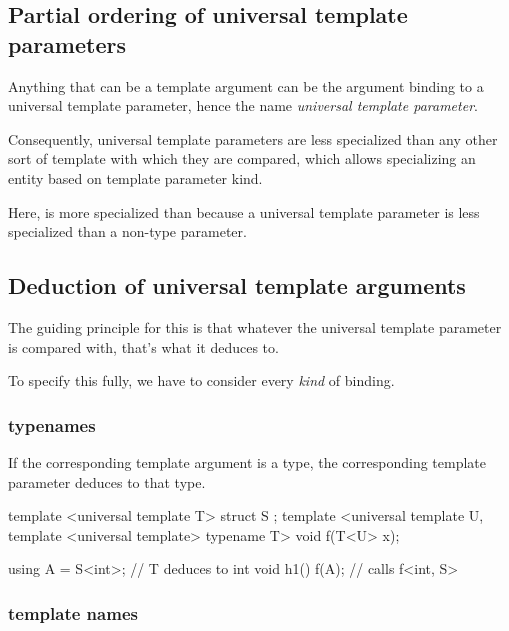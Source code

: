 \documentclass{wg21}
\begin{document}
\subsection{Partial ordering of universal template parameters}

Anything that can be a template argument can be the argument binding to a universal template parameter, hence the name \emph{universal template parameter}.

Consequently, universal template parameters are less specialized than any other sort of template with which they are compared,
which allows specializing an entity based on template parameter kind.


Here,  is more specialized than  because a universal template parameter is less specialized than a non-type parameter.

\subsection{Deduction of universal template arguments}

The guiding principle for this is that whatever the universal template parameter is compared with, that's what it deduces to.

To specify this fully, we have to consider every \emph{kind} of binding.

\subsubsection{typenames}

If the corresponding template argument is a type, the corresponding template parameter deduces to that type.

\begin{colorblock}
template <universal template T>
struct S {};
template <universal template U, template <universal template> typename T>
void f(T<U> x);

using A = S<int>; // T deduces to int
void h1() {
  f(A{}); // calls f<int, S>
}
\end{colorblock}

\subsubsection{template names}
\end{document}
